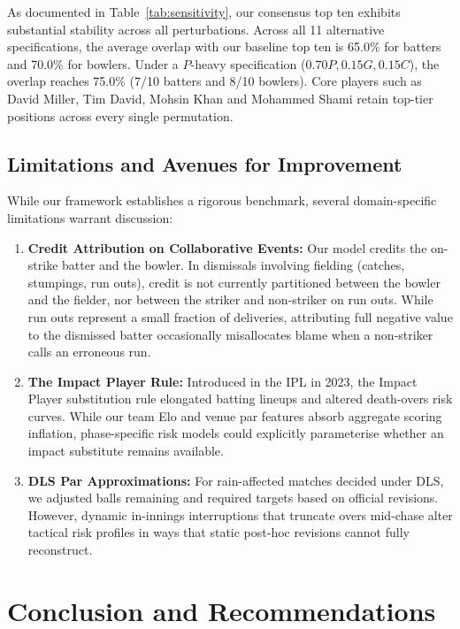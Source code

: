 \documentclass[11pt,a4paper]{article}
\begin{document}


As documented in Table~\ref{tab:sensitivity}, our consensus top ten exhibits substantial stability across all perturbations. Across all 11 alternative specifications, the average overlap with our baseline top ten is 65.0\% for batters and 70.0\% for bowlers. Under a $P$-heavy specification ($0.70 P, 0.15 G, 0.15 C$), the overlap reaches 75.0\% (7/10 batters and 8/10 bowlers). Core players such as David Miller, Tim David, Mohsin Khan and Mohammed Shami retain top-tier positions across every single permutation.

\subsection{Limitations and Avenues for Improvement}
While our framework establishes a rigorous benchmark, several domain-specific limitations warrant discussion:
\begin{enumerate}
    \item \textbf{Credit Attribution on Collaborative Events:} Our model credits the on-strike batter and the bowler. In dismissals involving fielding (catches, stumpings, run outs), credit is not currently partitioned between the bowler and the fielder, nor between the striker and non-striker on run outs. While run outs represent a small fraction of deliveries, attributing full negative value to the dismissed batter occasionally misallocates blame when a non-striker calls an erroneous run.
    \item \textbf{The Impact Player Rule:} Introduced in the IPL in 2023, the Impact Player substitution rule elongated batting lineups and altered death-overs risk curves. While our team Elo and venue par features absorb aggregate scoring inflation, phase-specific risk models could explicitly parameterise whether an impact substitute remains available.
    \item \textbf{DLS Par Approximations:} For rain-affected matches decided under DLS, we adjusted balls remaining and required targets based on official revisions. However, dynamic in-innings interruptions that truncate overs mid-chase alter tactical risk profiles in ways that static post-hoc revisions cannot fully reconstruct.
\end{enumerate}

\section{Conclusion and Recommendations}
\label{sec:conclusion}
\end{document}
